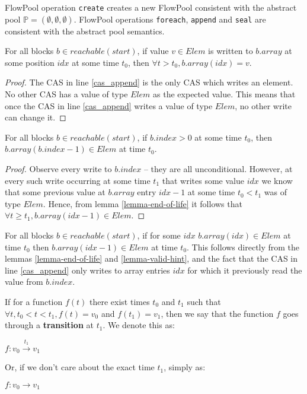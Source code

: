 \documentclass[runningheads,a4paper]{llncs}
\begin{document}
\begin{theorem}
FlowPool operation \verb=create= creates a new FlowPool consistent with the abstract pool 
$\mathbb{P} = (\emptyset, \emptyset, \emptyset)$. FlowPool operations \verb=foreach=, \verb=append= 
and \verb=seal= are consistent with the abstract pool semantics.
\end{theorem}


\begin{lemma}\label{lemma-end-of-life}
For all blocks $b \in reachable(start)$, if value $v \in Elem$ is
written to $b.array$ at some position $idx$ at some time $t_0$, then
$\forall t > t_0, b.array(idx) = v$.
\end{lemma}

\begin{proof}
The CAS in line \ref{cas_append} is the only CAS which writes an
element.
No other CAS has a value of type $Elem$ as the expected value.
This means that once the CAS in line \ref{cas_append} writes a value
of type $Elem$, no other write can change it.
\end{proof}


\begin{lemma}\label{lemma-valid-hint}
For all blocks $b \in reachable(start)$, if $b.index > 0$ at some time $t_0$, then
$b.array(b.index - 1) \in Elem$ at time $t_0$.
\end{lemma}

\begin{proof}
Observe every write to $b.index$ -- they are all unconditional.
However, at every such write occurring at some time $t_1$ that writes
some value $idx$ we know that some previous value at $b.array$ entry $idx - 1$
at some time $t_0 < t_1$ was of type $Elem$.
Hence, from lemma \ref{lemma-end-of-life} it follows that
$\forall t \geq t_1, b.array(idx - 1) \in Elem$.
\end{proof}


\begin{corollary}[Compactness]\label{cor-compactness}
For all blocks $b \in reachable(start)$, if for some $idx$
$b.array(idx) \in Elem$ at time $t_0$ then $b.array(idx - 1) \in Elem$
at time $t_0$. This follows
directly from the lemmas \ref{lemma-end-of-life} and
\ref{lemma-valid-hint}, and the fact that the CAS in line
\ref{cas_append} only writes to array entries $idx$ for which it
previously read the value from $b.index$.
\end{corollary}


\begin{definition}[Transition]
If for a function $f(t)$ there exist times $t_0$ and $t_1$ such that
$\forall t, t_0 < t < t_1, f(t) = v_0$ and $f(t_1) = v_1$, then we say
that the function $f$ goes through a \textbf{transition} at $t_1$. We denote this as:

$f: v_0 \stackrel{t_1}{\rightarrow} v_1$

Or, if we don't care about the exact time $t_1$, simply as:

$f: v_0 \rightarrow v_1$
\end{definition}
\end{document}
